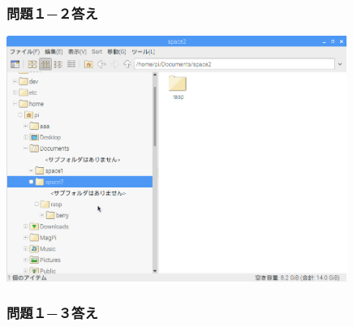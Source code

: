 \documentclass[a4paper,12pt]{jarticle}
\begin{document}
\bigskip


\bigskip


\bigskip

\subsubsection{\bfseries
  問題１−２答え}

\bigskip



\centering
\includegraphics[width=11.081cm,height=8.008cm]{textbook-img213.png}
\flushleft

\clearpage\subsubsection{\bfseries
  問題１−３答え}
\end{document}
